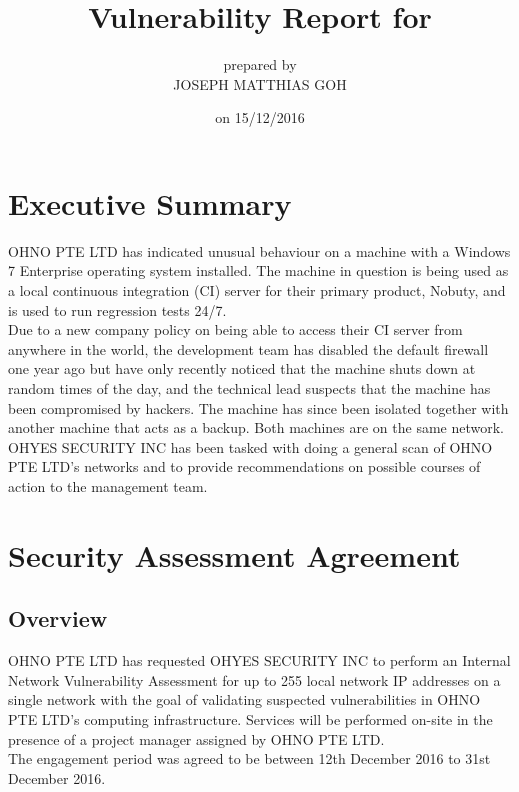\documentclass[11pt, oneside]{article}   	%
\title{
	Vulnerability Report for\\
	\clientName{}
}
\author{
	prepared by\\
	JOSEPH MATTHIAS GOH\\
	\myName{}
}
\date{on 15/12/2016}
\newcommand{\myName}{OHYES SECURITY INC}
\newcommand{\clientName}{OHNO PTE LTD}
\begin{document}
\maketitle
\newpage

\tableofcontents
\newpage

\section{Executive Summary}
\clientName{} has indicated unusual behaviour on a machine
with a Windows 7 Enterprise operating system installed. The machine
in question is being used as a local continuous integration (CI) server
for their primary product, Nobuty, and is used to run regression tests 24/7.\\

Due to a new company policy on being able to access their CI server from
anywhere in the world, the development team has disabled the default
firewall one year ago but have only recently noticed that the machine
shuts down at random times of the day, and the technical lead suspects
that the machine has been compromised by hackers. The machine has since
been isolated together with another machine that acts as a backup. Both
machines are on the same network.\\

\myName{} has been tasked with doing a general scan of \clientName{}'s 
networks and to provide recommendations on possible courses of action
to the management team.

\clearpage
\section{Security Assessment Agreement}
\label{SecurityAssessmentAgreement}
\subsection{Overview}
\clientName{} has requested \myName{} to perform an Internal Network
Vulnerability Assessment for up to 255 local network IP addresses on a
single network with the goal of validating suspected vulnerabilities
in \clientName{}'s  computing infrastructure. Services will be performed
on-site in the  presence of a project manager assigned by \clientName{}.\\

The engagement period was agreed to be between 12th December 2016 to 31st December 2016.
\end{document}
